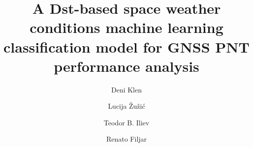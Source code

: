 \documentclass[preprint,12pt]{elsarticle}
\begin{document}
\begin{frontmatter}
\title{A Dst-based space weather conditions machine learning classification  model for GNSS PNT performance analysis} %
\author[1,2]{Deni Klen}
\author[1,2]{Lucija \v{Z}u\v{z}i\'{c}}
\author[3]{Teodor B. Iliev}%
\author[1,2,4]{Renato Filjar}%
 

\end{frontmatter}
\end{document}
